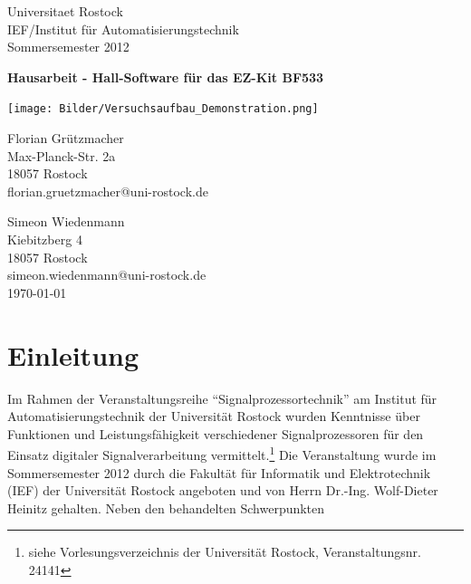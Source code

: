 \documentclass[a4paper,12pt,fontsize=12,DIV=12]{scrartcl}
\begin{document}
\begin{titlepage}
\begin{small}
\vfill {Universitaet Rostock\\ 
IEF/Institut für Automatisierungstechnik\\ 
Sommersemester 2012}
\end{small}


\begin{center}
\begin{Large}
\vfill {\textsf{\textbf{
	Hausarbeit - Hall-Software für das EZ-Kit BF533
}}}
\end{Large}
\end{center}

\begin{center}
\vspace{2.0cm}
\texttt{[image: Bilder/Versuchsaufbau\_Demonstration.png]}
\end{center}

\begin{small}
\vfill Florian Grützmacher \\ Max-Planck-Str. 2a \\  18057 Rostock \\  florian.gruetzmacher@uni-rostock.de\\ 
\end{small}

\vspace{-5.0cm}

\begin{small}
\vfill Simeon Wiedenmann \\ Kiebitzberg 4 \\  18057 Rostock \\  simeon.wiedenmann@uni-rostock.de\\ 
\newline
\today
\end{small}

\end{titlepage}


\tableofcontents
\thispagestyle{empty}

\clearpage

\onehalfspacing

\pagestyle{plain}


\section{Einleitung}
Im Rahmen der Veranstaltungsreihe "`Signalprozessortechnik"' am Institut für Automatisierungstechnik der Universität Rostock wurden Kenntnisse über Funktionen und Leistungsfähigkeit verschiedener Signalprozessoren für den Einsatz digitaler Signalverarbeitung vermittelt.\footnote{siehe Vorlesungsverzeichnis der Universität Rostock, Veranstaltungsnr. 24141 }
Die Veranstaltung wurde im Sommersemester 2012 durch die Fakultät für Informatik und Elektrotechnik (IEF) der Universität Rostock angeboten und von Herrn Dr.-Ing. Wolf-Dieter Heinitz gehalten.
Neben den behandelten Schwerpunkten
\end{document}
